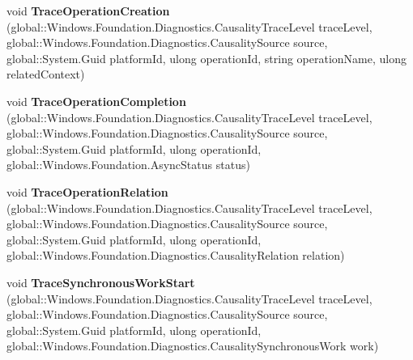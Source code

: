 \begin{DoxyCompactItemize}
void {\bfseries Trace\+Operation\+Creation} (global\+::\+Windows.\+Foundation.\+Diagnostics.\+Causality\+Trace\+Level trace\+Level, global\+::\+Windows.\+Foundation.\+Diagnostics.\+Causality\+Source source, global\+::\+System.\+Guid platform\+Id, ulong operation\+Id, string operation\+Name, ulong related\+Context)
\item 
\mbox{\label{interface_windows_1_1_foundation_1_1_diagnostics_1_1_i_async_causality_tracer_statics_ac5e3ac3c90be930394f03ec531d863cd}} 
void {\bfseries Trace\+Operation\+Completion} (global\+::\+Windows.\+Foundation.\+Diagnostics.\+Causality\+Trace\+Level trace\+Level, global\+::\+Windows.\+Foundation.\+Diagnostics.\+Causality\+Source source, global\+::\+System.\+Guid platform\+Id, ulong operation\+Id, global\+::\+Windows.\+Foundation.\+Async\+Status status)
\item 
\mbox{\label{interface_windows_1_1_foundation_1_1_diagnostics_1_1_i_async_causality_tracer_statics_ad69dacbb1c6dd0ede745f227c69d8d16}} 
void {\bfseries Trace\+Operation\+Relation} (global\+::\+Windows.\+Foundation.\+Diagnostics.\+Causality\+Trace\+Level trace\+Level, global\+::\+Windows.\+Foundation.\+Diagnostics.\+Causality\+Source source, global\+::\+System.\+Guid platform\+Id, ulong operation\+Id, global\+::\+Windows.\+Foundation.\+Diagnostics.\+Causality\+Relation relation)
\item 
\mbox{\label{interface_windows_1_1_foundation_1_1_diagnostics_1_1_i_async_causality_tracer_statics_a749785813f9caf99b9ac0f4fd89700a2}} 
void {\bfseries Trace\+Synchronous\+Work\+Start} (global\+::\+Windows.\+Foundation.\+Diagnostics.\+Causality\+Trace\+Level trace\+Level, global\+::\+Windows.\+Foundation.\+Diagnostics.\+Causality\+Source source, global\+::\+System.\+Guid platform\+Id, ulong operation\+Id, global\+::\+Windows.\+Foundation.\+Diagnostics.\+Causality\+Synchronous\+Work work)
\item 
\mbox{\label{interface_windows_1_1_foundation_1_1_diagnostics_1_1_i_async_causality_tracer_statics_a1543ef1de5733e88b1cf2a3424c199f5}} 

\end{DoxyCompactItemize}
